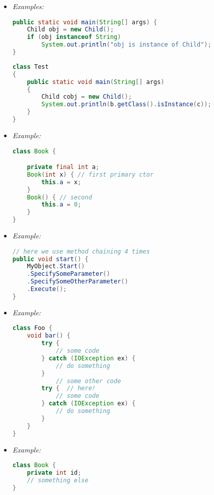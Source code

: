 \begin{itemize}
	\item {}
{\it Examples:}
	\begin{lstlisting}[language=Java]
public static void main(String[] args) {
	Child obj = new Child();
	if (obj instanceof String)
		System.out.println("obj is instance of Child");
}
\end{lstlisting}
\begin{lstlisting}[language=Java]
class Test
{
	public static void main(String[] args)
	{
		Child cobj = new Child();
		System.out.println(b.getClass().isInstance(c));
	}
}
\end{lstlisting}

	\item {}
	{\it Example:}
\begin{lstlisting}[language=Java]
class Book {

	private final int a;
	Book(int x) { // first primary ctor
		this.a = x;
	}
	Book() { // second
		this.a = 0;
	}
}
\end{lstlisting}

	\item {}
{\it Example:}
\begin{lstlisting}[language=Java]
// here we use method chaining 4 times
public void start() {
	MyObject.Start()
	.SpecifySomeParameter()
	.SpecifySomeOtherParameter()
	.Execute();
}
\end{lstlisting}

	\item {}
{\it Example:}
\begin{lstlisting}[language=Java]
class Foo {
	void bar() {
		try {
			// some code
		} catch (IOException ex) {
			// do something
		}
			// some other code
		try {  // here!
			// some code
		} catch (IOException ex) {
			// do something
		}
	}
}
\end{lstlisting}

	\item {}
{\it Example:}
\begin{lstlisting}[language=Java]
class Book {
	private int id;
	// something else
}
\end{lstlisting}


\end{itemize}
